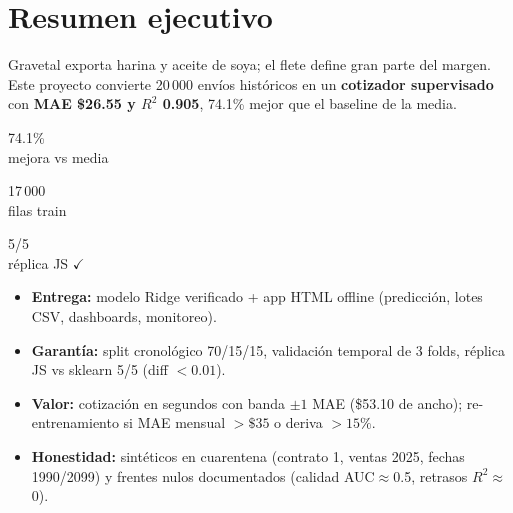 \documentclass[11pt]{article}
\begin{document}
\section{Resumen ejecutivo}
Gravetal exporta harina y aceite de soya; el flete define gran parte del margen.
Este proyecto convierte 20\,000 envíos históricos en un \textbf{cotizador supervisado}
con \textbf{MAE \$26.55 y $R^2$ 0.905}, 74.1\% mejor que el baseline de la media.
\begin{center}
\begin{minipage}{0.31\linewidth}\begin{kpi}74.1\%\\{\small mejora vs media}\end{kpi}\end{minipage}\hfill
\begin{minipage}{0.31\linewidth}\begin{kpi}17\,000\\{\small filas train}\end{kpi}\end{minipage}\hfill
\begin{minipage}{0.31\linewidth}\begin{kpi}5/5\\{\small réplica JS $\checkmark$}\end{kpi}\end{minipage}
\end{center}
\begin{itemize}[leftmargin=*]
\item \textbf{Entrega:} modelo Ridge verificado + app HTML offline (predicción, lotes CSV, dashboards, monitoreo).
\item \textbf{Garantía:} split cronológico 70/15/15, validación temporal de 3 folds, réplica JS vs sklearn 5/5 (diff $<0.01$).
\item \textbf{Valor:} cotización en segundos con banda $\pm1$ MAE (\$53.10 de ancho); re-entrenamiento si MAE mensual $>\$35$ o deriva $>15\%$.
\item \textbf{Honestidad:} sintéticos en cuarentena (contrato 1, ventas 2025, fechas 1990/2099) y frentes nulos documentados (calidad AUC$\approx$0.5, retrasos $R^2\approx$0).
\end{itemize}
\end{document}
